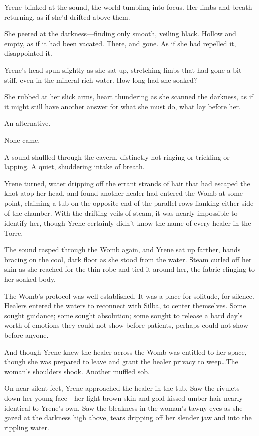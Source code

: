 Yrene blinked at the sound, the world tumbling into focus.
Her limbs and breath returning, as if she'd drifted above them.

She peered at the darkness---finding only smooth, veiling black.
Hollow and empty, as if it had been vacated.
There, and gone.
As if she had repelled it, disappointed it.

Yrene's head spun slightly as she sat up, stretching limbs that had gone a bit stiff, even in the mineral-rich water.
How long had she soaked?

She rubbed at her slick arms, heart thundering as she scanned the darkness, as if it might still have another answer for what she must do, what lay before her.

An alternative.

None came.

A sound shuffled through the cavern, distinctly not ringing or trickling or lapping.
A quiet, shuddering intake of breath.

Yrene turned, water dripping off the errant strands of hair that had escaped the knot atop her head, and found another healer had entered the Womb at some point, claiming a tub on the opposite end of the parallel rows flanking either side of the chamber.
With the drifting veils of steam, it was nearly impossible to identify her, though Yrene certainly didn't know the name of every healer in the Torre.

The sound rasped through the Womb again, and Yrene sat up farther, hands bracing on the cool, dark floor as she stood from the water.
Steam curled off her skin as she reached for the thin robe and tied it around her, the fabric clinging to her soaked body.

The Womb's protocol was well established.
It was a place for solitude, for silence.
Healers entered the waters to reconnect with Silba, to center themselves.
Some sought guidance; some sought absolution; some sought to release a hard day's worth of emotions they could not show before patients, perhaps could not show before anyone.

And though Yrene knew the healer across the Womb was entitled to her space, though she was prepared to leave and grant the healer privacy to weep\ldots The woman's shoulders shook.
Another muffled sob.

On near-silent feet, Yrene approached the healer in the tub.
Saw the rivulets down her young face---her light brown skin and gold-kissed umber hair nearly identical to Yrene's own.
Saw the bleakness in the woman's tawny eyes as she gazed at the darkness high above, tears dripping off her slender jaw and into the rippling water.

